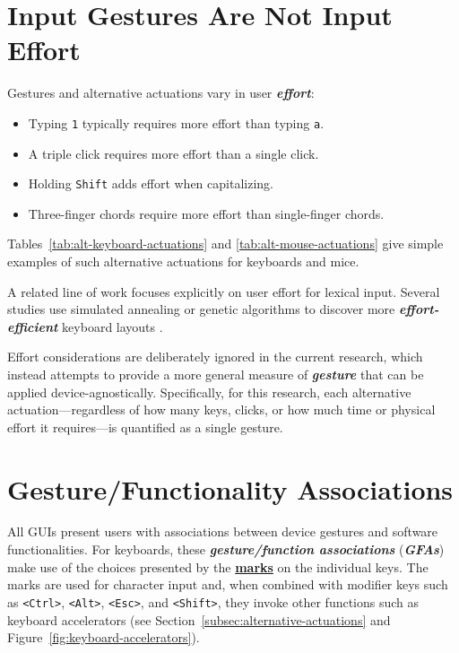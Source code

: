 \section{Input Gestures Are Not Input
	Effort}\label{input-gestures-are-not-input-effort}

Gestures and alternative actuations vary in user \emph{\textbf{effort}}:

\begin{itemize}
	\item Typing \texttt{1} typically requires more effort than typing
	\texttt{a}.
	\item A triple click requires more effort than a single click.
	\item Holding \texttt{Shift} adds effort when capitalizing.
	\item Three-finger chords require more effort than single-finger
	chords.
\end{itemize}

Tables~\ref{tab:alt-keyboard-actuations} and
\ref{tab:alt-mouse-actuations} give simple examples of such alternative
actuations for keyboards and mice.

A related line of work focuses explicitly on user effort for lexical
input. Several studies use simulated annealing or genetic algorithms to
discover more \emph{\textbf{effort-efficient}} keyboard layouts
\parencite{Francis2006OptimizedKeyboards,
	Light1993SimulatedAnnealingKeyboards,
	Onsorodi2020GeneticAlgorithmKeyboardLayout}.

Effort considerations are deliberately ignored in the current research,
which instead attempts to provide a more general measure of
\emph{\textbf{gesture}} that can be applied device-agnostically.
Specifically, for this research, each alternative actuation—regardless
of how many keys, clicks, or how much time or physical effort it
requires—is quantified as a single gesture.

\section{Gesture/Functionality
	Associations}\label{gesturefunctionality-associations}

All GUIs present users with associations between device gestures and
software functionalities. For keyboards, these
\emph{\textbf{gesture/function associations}} (\emph{\textbf{GFAs}})
make use of the choices presented by the \textbf{\uline{marks}} on the
individual keys. The marks are used for character input and, when
combined with modifier keys such as
\texttt{\textless Ctrl\textgreater},
\texttt{\textless Alt\textgreater},
\texttt{\textless Esc\textgreater}, and
\texttt{\textless Shift\textgreater}, they invoke other functions such
as keyboard accelerators (see
Section~\ref{subsec:alternative-actuations} and
Figure~\ref{fig:keyboard-accelerators}).


